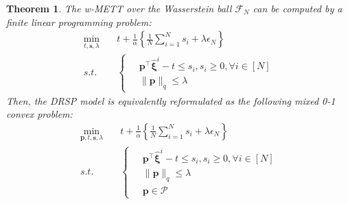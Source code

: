\documentclass{article}
\newtheorem{thm}{Theorem}
\begin{document}
\begin{thm}
	The w-METT over the Wasserstein ball $\mathcal{F}_N$ can be computed by a finite linear programming problem:
	\begin{align}
		\min_{t, \bm{s}, \lambda} \quad & t + \frac{1}{\alpha} \left\{\frac{1}{N} \sum_{i=1}^{N}s_i + \lambda \epsilon_N\right\} \\
		s.t. \quad & \left\{
		\begin{aligned}
			\ & \bm{p}^\top \hat{\bm{\xi}}^i - t \leq s_i, s_i \geq 0, \forall i \in [N] \\
			& \|\bm{p}\|_q \leq \lambda
		\end{aligned}\right. 
	\end{align}
	Then, the DRSP model is equivalently reformulated as the following mixed 0-1 convex problem:
	\begin{align}
		\min_{\bm{p}, t, \bm{s}, \lambda} \quad & t + \frac{1}{\alpha} \left\{\frac{1}{N} \sum_{i=1}^{N} s_i + \lambda \epsilon_N\right\} \\
		s.t. \quad & \left\{
		\begin{aligned}
			\ & \bm{p}^\top \hat{\bm{\xi}}^i - t \leq s_i, s_i \geq 0, \forall i \in [N] \\
			& \|\bm{p}\|_q \leq \lambda \\
			& \bm{p} \in \mathcal{P}
		\end{aligned} \right. 
	\end{align}
\end{thm}
\end{document}
